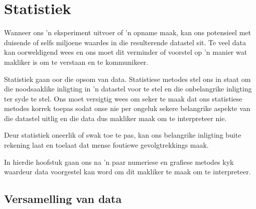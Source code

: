 \chapter{Statistiek}


Wanneer ons 'n eksperiment uitvoer of 'n opname maak, kan ons potensieel met duisende of selfs miljoene waardes in die resulterende datastel sit. Te veel data kan oorweldigend wees en ons moet dit verminder of voorstel op 'n manier wat makliker is om te verstaan en te kommunikeer.\par 

Statistiek gaan oor die opsom van data. Statistiese metodes stel ons in staat om die noodsaaklike inligting in 'n datastel voor te stel en die onbelangrike inligting ter syde te stel. Ons moet versigtig wees om seker te maak dat ons statistiese metodes korrek toepas sodat onse nie per ongeluk sekere belangrike aspekte van die datastel uitlig en die data dus makliker maak om te interpreteer nie. \par

Deur statistiek oneerlik of swak toe te pas, kan ons belangrike inligting buite rekening laat en toelaat dat mense foutiewe gevolgtrekkings maak. \par

In hierdie hoofstuk gaan ons na 'n paar numeriese en grafiese metodes kyk waardeur data voorgestel kan word om dit makliker te maak om te interpreteer.\par



\par
{}

\section{Versamelling van data}

